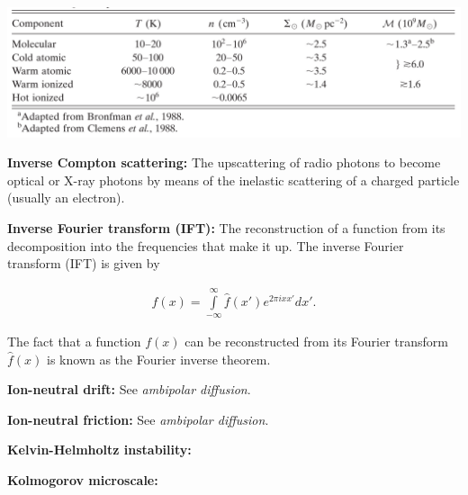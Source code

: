 \documentclass[a4paper,10pt]{article}
\begin{document}
\begin{table}[h]
\begin{center}
 \label{table:ismphases}
\includegraphics[width=15cm]{figures/ISMphases.png}
\end{center}
\end{table}

{\noindent}\textbf{Inverse Compton scattering:} The upscattering of radio photons to become optical or X-ray photons by means of the inelastic scattering of a charged particle (usually an electron).

{\noindent}\textbf{Inverse Fourier transform (IFT):} The reconstruction of a function from its decomposition into the frequencies that make it up. The inverse Fourier transform (IFT) is given by

\begin{align*}
    f(x) = \int\limits_{-\infty}^\infty \hat{f}(x')e^{2\pi ixx'}dx'.
\end{align*}

{\noindent}The fact that a function $f(x)$ can be reconstructed from its Fourier transform $\hat{f}(x)$ is known as the Fourier inverse theorem.

{\noindent}\textbf{Ion-neutral drift:} See \textit{ambipolar diffusion}.

{\noindent}\textbf{Ion-neutral friction:} See \textit{ambipolar diffusion}.

{\noindent}\textbf{Kelvin-Helmholtz instability:}

{\noindent}\textbf{Kolmogorov microscale:}
\end{document}
